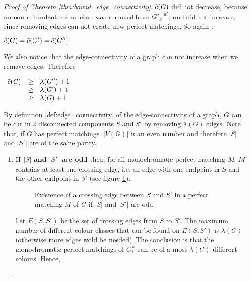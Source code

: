 \begin{proof}[Proof of Theorem \ref{thm:bound_edge_connectivity}]
    $\Tilde{c}(G)$ did not decrease, because no non-redundant colour class was removed from ${G'_{k'}}^{w'}$, and did not increase, since removing edges can not create new perfect matchings. So again : 
    
    \begin{center}
        $\Tilde{c}(G) = \Tilde{c}(G') = \Tilde{c}(G'')$
    \end{center}
    
    We also notice that the edge-connectivity of a graph can not increase when we remove edges. Therefore
    
    \begin{center}
        $\begin{array}{l c l}
            \Tilde{c}(G) & \geq & \lambda(G'') + 1 \\
                         & \geq & \lambda(G') + 1 \\
                         & \geq & \lambda(G) + 1
        \end{array}$
    \end{center}
    
    By definition \ref{def:edge_connectivity} of the edge-connectivity of a graph, $G$ can be cut in 2 disconnected components $S$ and $S'$ by removing $\lambda(G)$ edges. Note that, if $G$ has perfect matchings, $|V(G)|$ is an even number and therefore $|S|$ and $|S'|$ are of the same parity.
    
    \begin{enumerate}
        \item 
            \textbf{If $|S|$ and $|S'|$ are odd} then, for all monochromatic perfect matching $M$, $M$ contains at least one crossing edge, i.e. an edge with one endpoint in $S$ and the other endpoint in $S'$ (see figure \ref{fig:proof_lambda_odd}).
            
            \begin{figure}[H]
                \caption{Existence of a crossing edge between $S$ and $S'$ in a perfect matching $M$ of $G$ if $|S|$ and $|S'|$ are odd.}
                \label{fig:proof_lambda_odd}
            \end{figure}
            
            Let $E(S, S')$ be the set of crossing edges from $S$ to $S'$. The maximum number of different colour classes that can be found on $E(S, S')$ is $\lambda(G)$ (otherwise more edges wold be needed). The conclusion is that the monochromatic perfect matchings of $G_k^w$ can be of a most $\lambda(G)$ different colours. Hence, 
            

\end{enumerate}
\end{proof}
